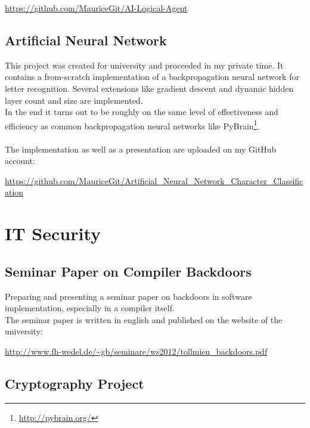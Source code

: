 \documentclass[a4paper, 12pt]{article}
\begin{document}
\begin{center}
	\url{https://github.com/MauriceGit/AI-Logical-Agent}
\end{center}

\subsection{Artificial Neural Network}

This project was created for university and proceeded in my private time. It contains a from-scratch implementation
of a backpropagation neural network for letter recognition. Several extensions like 
gradient descent and dynamic hidden layer count and size are implemented.
\\
In the end it turns out to be roughly on the same level of effectiveness and efficiency as common backpropagation neural networks
like PyBrain\footnote{\url{http://pybrain.org/}}.
\\
\\
The implementation as well as a presentation are uploaded on my GitHub account:

\begin{center}
	\url{https://github.com/MauriceGit/Artificial_Neural_Network_Character_Classification}
\end{center}

\section{IT Security}

\subsection{Seminar Paper on Compiler Backdoors}

Preparing and presenting a seminar paper on backdoors in software implementation, especially in 
a compiler itself.
\\
The seminar paper is written in english and published on the website of the university:

\begin{center}
	\url{http://www.fh-wedel.de/~gb/seminare/ws2012/tollmien_backdoors.pdf}
\end{center}

\subsection{Cryptography Project}
\end{document}
